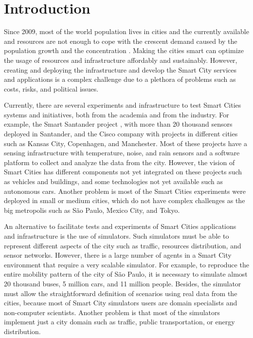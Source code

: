 \chapter{Introduction}
\label{cap:introducao}

Since 2009, most of the world population lives in cities \cite{un2009urbanRural} and the currently available and resources are not enough to cope with the crescent demand caused by the population growth and the concentration \cite{caragliu2011smart}. Making the cities smart can optimize the usage of resources and infrastructure affordably and sustainably. However, creating and deploying the infrastructure and develop the Smart City services and applications is a complex challenge due to a plethora of problems such as costs, risks, and political issues.

Currently, there are several experiments and infrastructure to test Smart Cities systems and initiatives, both from the academia and from the industry. For example, the Smart Santander project \cite{sanchez2014smartsantander}, with more than 20 thousand sensors deployed in Santander, and the Cisco company with projects in different cities such as Kansas City, Copenhagen, and Manchester. Most of these projects have a sensing infrastructure with temperature, noise, and rain sensors and a software platform to collect and analyze the data from the city. However, the vision of Smart Cities has different components not yet integrated on these projects such as vehicles and buildings, and some technologies not yet available such as autonomous cars. Another problem is most of the Smart Cities experiments were deployed in small or medium cities, which do not have complex challenges as the big metropolis such as S\~ao Paulo, Mexico City, and Tokyo.

An alternative to facilitate tests and experiments of Smart Cities applications and infrastructure is the use of simulators. Such simulators must be able to represent different aspects of the city such as traffic, resources distribution, and sensor networks. However, there is a large number of agents in a Smart City environment that require a very scalable simulator. For example, to reproduce the entire mobility pattern of the city of S\~ao Paulo, it is necessary to simulate almost  20 thousand buses, 5 million cars, and 11 million people. Besides, the simulator must allow the straightforward definition of scenarios using real data from the cities, because most of Smart City simulators users are domain specialists and non-computer scientists. Another problem is that most of the simulators implement just a city domain such as traffic, public transportation, or energy distribution.

